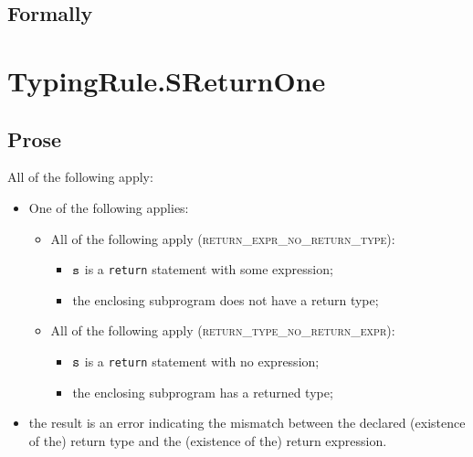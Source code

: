 
\subsection{Formally}
\begin{mathpar}
\end{mathpar}


\section{TypingRule.SReturnOne \label{sec:TypingRule.SReturnOne}}

\subsection{Prose}
All of the following apply:
\begin{itemize}
\item One of the following applies:
  \begin{itemize}
    \item All of the following apply (\textsc{return\_expr\_no\_return\_type}):
    \begin{itemize}
      \item $\vs$ is a \texttt{return} statement with some expression;
      \item the enclosing subprogram does not have a return type;
    \end{itemize}
    \item All of the following apply (\textsc{return\_type\_no\_return\_expr}):
    \begin{itemize}
      \item $\vs$ is a \texttt{return} statement with no expression;
      \item the enclosing subprogram has a returned type;
    \end{itemize}
  \end{itemize}
  \item the result is an error indicating the mismatch between the declared (existence of the) return type
        and the (existence of the) return expression.
\end{itemize}

